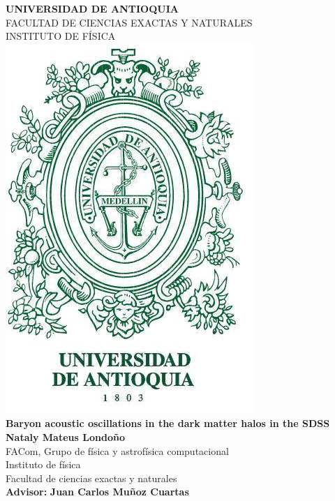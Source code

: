 \begin{titlepage}

	\begin{center}
	
		{\normalsize \textbf{UNIVERSIDAD DE ANTIOQUIA}}\\
		{\normalsize FACULTAD DE CIENCIAS EXACTAS Y NATURALES \\ INSTITUTO DE FÍSICA}
		\\[1cm]	
        \includegraphics[width = 3 cm]{Images/UdeA_Shield}
		\\[1.5cm]
				
		{\LARGE \textbf{ Baryon acoustic oscillations in the dark matter halos in the SDSS }}
		\\[1cm]
		

		{\Large \textbf{Nataly Mateus Londoño}}
		\\[0.1cm]
		{ \small FACom, Grupo de física y astrofísica computacional\\[0.01cm] Instituto de física\\[0.01cm] Facultad de ciencias exactas y naturales  }
		\\[0.3cm]
		
		{\large \textbf{\textbf{Advisor:}}  \textbf{ Juan Carlos Muñoz Cuartas }}
		\\[0.8cm]
	
		\vspace{1.3cm}
		
		\vfill
		
	
	\end{center}
	
	
	\newpage
	\thispagestyle{empty}
	\cleardoublepage
	\newpage
	\thispagestyle{empty}
	
	\begin{center}
	

\end{center}
\end{titlepage}
